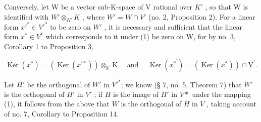 Conversely, let W be a vector sub-K-space of V rational over \(K'\) , so that W is identified with \(W' \otimes_{K'} K\) , where \(W' = W \cap V'\) (no. 2, Proposition 2). For a linear form \(x'^* \in V'^*\) to be zero on \(W'\) , it is necessary and sufficient that the linear form \(x^* \in V^*\) which corresponds to it under (1) be zero on W, for by no. 3, Corollary 1 to Proposition 3,

\[
\operatorname{Ker} (x ^ {*}) = \left(\operatorname{Ker} (x ^ {\prime *})\right) \otimes_ {\mathbb {K} ^ {\prime}} \mathrm{K} \quad \text { and } \quad \operatorname{Ker} (x ^ {* ^ {\prime}}) = (\operatorname{Ker} (x ^ {*})) \cap \mathrm{V} ^ {\prime}.
\]

Let \(H'\) be the orthogonal of \(W'\) in \(V'^*\); we know (§ 7, no. 5, Theorem 7) that \(W'\) is the orthogonal of \(H'\) in \(V'\) ; if \(H\) is the image of \(H'\) in \(V*\) under the mapping (1), it follows from the above that \(W\) is the orthogonal of \(H\) in \(V\) , taking account of no. 7, Corollary to Proposition 14.

